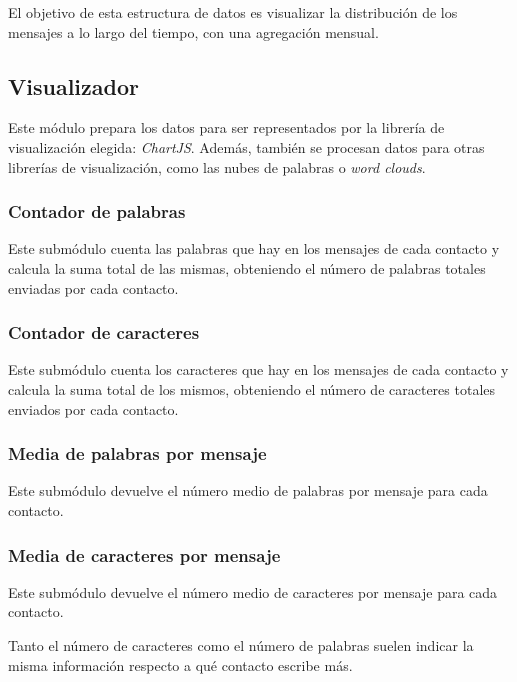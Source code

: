El objetivo de esta estructura de datos es visualizar la distribución de los mensajes a lo largo del tiempo, con una agregación mensual.

\subsection{Visualizador}


Este módulo prepara los datos para ser representados por la librería de visualización elegida: \textit{ChartJS}. Además, también se procesan datos para otras librerías de visualización, como las nubes de palabras o \textit{word clouds}.

\subsubsection{Contador de palabras}

Este submódulo cuenta las palabras que hay en los mensajes de cada contacto y calcula la suma total de las mismas, obteniendo el número de palabras totales enviadas por cada contacto.

\subsubsection{Contador de caracteres}

Este submódulo cuenta los caracteres que hay en los mensajes de cada contacto y calcula la suma total de los mismos, obteniendo el número de caracteres totales enviados por cada contacto.

\subsubsection{Media de palabras por mensaje}

Este submódulo devuelve el número medio de palabras por mensaje para cada contacto.

\subsubsection{Media de caracteres por mensaje}

Este submódulo devuelve el número medio de caracteres por mensaje para cada contacto.

Tanto el número de caracteres como el número de palabras suelen indicar la misma información respecto a qué contacto escribe más.

